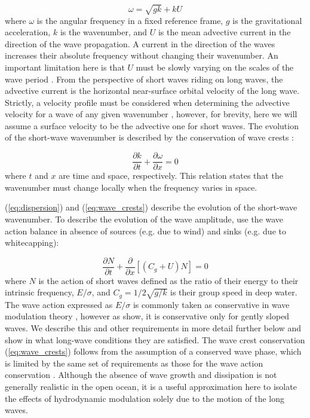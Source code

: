 \documentclass[lineno]{jfm}
\begin{document}
\begin{equation}
\label{eq:dispersion}
\omega = \sqrt{gk} + k U
\end{equation}
where $\omega$ is the angular frequency in a fixed reference frame, $g$ is the
gravitational acceleration, $k$ is the wavenumber, and $U$ is the mean advective
current in the direction of the wave propagation.
A current in the direction of the waves increases their absolute frequency
without changing their wavenumber.
An important limitation here is that $U$ must be slowly varying on the scales of
the wave period \citep{bretherton1968wavetrains}.
From the perspective of short waves riding on long waves, the advective current
is the horizontal near-surface orbital velocity of the long wave.
Strictly, a velocity profile must be considered when determining the
advective velocity for a wave of any given wavenumber \citep{stewart1974hf},
however, for brevity, here we will assume a surface velocity to be the advective
one for short waves.
The evolution of the short-wave wavenumber is described by the conservation of
wave crests \citep[e.g.,][]{whitham1974dispersive,phillips1981dispersion}:

\begin{equation}
\label{eq:wave_crests}
\dfrac{\partial k}{\partial t}
+ \dfrac{\partial \omega}{\partial x}
= 0
\end{equation}
where $t$ and $x$ are time and space, respectively.
This relation states that the wavenumber must change locally when the frequency
varies in space.

(\ref{eq:dispersion}) and (\ref{eq:wave_crests}) describe the evolution of
the short-wave wavenumber.
To describe the evolution of the wave amplitude, use the wave action balance
\citep{bretherton1968wavetrains} in absence of sources (e.g. due to wind) and
sinks (e.g. due to whitecapping):

\begin{equation}
\label{eq:wave_action}
\dfrac{\partial N}{\partial t}
+ \dfrac{\partial}{\partial x} \left[\left(C_g + U\right)N\right]
= 0
\end{equation}
where $N$ is the action of short waves defined as the ratio of their
energy to their intrinsic frequency, $E/\sigma$,
and $C_g = 1/2\sqrt{g/k}$ is their group speed in deep water.
The wave action expressed as $E/\sigma$ is commonly taken as
conservative in wave modulation theory
\citep{phillips1981dispersion,longuet1987propagation}, however as
\citet{dysthe1988orbiting} show, it is conservative only for gently sloped waves.
We describe this and other requirements in more detail further below and show
in what long-wave conditions they are satisfied.
The wave crest conservation (\ref{eq:wave_crests}) follows from the assumption
of a conserved wave phase, which is limited by the same set of requirements as
those for the wave action conservation \citep[e.g.,][]{whitham1974dispersive}.
Although the absence of wave growth and dissipation is not generally realistic in
the open ocean, it is a useful approximation here to isolate the effects
of hydrodynamic modulation solely due to the motion of the long waves.
\end{document}
